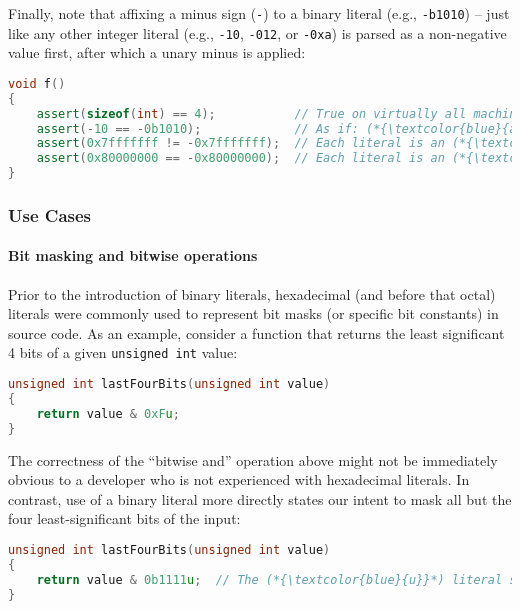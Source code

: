 \documentclass[twoside,10pt,letterpaper,usenames]{newstyle-PearsonGeneric-7-38}
\begin{document}
Finally, note that affixing a minus sign (\texttt{-}) to a binary
literal (e.g., \texttt{-b1010}) -- just like any other integer literal
(e.g., \texttt{-10}, \texttt{-012}, or \texttt{-0xa}) is parsed as a
non-negative value first, after which a unary minus is applied:

\begin{lstlisting}[language=C++]
void f()
{
    assert(sizeof(int) == 4);           // True on virtually all machines today.
    assert(-10 == -0b1010);             // As if: (*{\textcolor{blue}{assert(0 - 10 == 0 - 0b1010);}}*)
    assert(0x7fffffff != -0x7fffffff);  // Each literal is an (*{\textcolor{blue}{signed int}}*).
    assert(0x80000000 == -0x80000000);  // Each literal is an (*{\textcolor{blue}{unsigned int}}*).
}
\end{lstlisting}
    

\subsubsection[Use Cases]{Use Cases}\label{use-cases}

\paragraph[Bit masking and bitwise operations]{Bit masking and bitwise operations}\label{bit-masking-and-bitwise-operations}

Prior to the introduction of binary literals, hexadecimal (and before
that octal) literals were commonly used to represent bit masks (or
specific bit constants) in source code. As an example, consider a
function that returns the least significant 4 bits of a given
\texttt{unsigned int} value:

\begin{lstlisting}[language=C++]
unsigned int lastFourBits(unsigned int value)
{
    return value & 0xFu;
}
\end{lstlisting}
    

The correctness of the ``bitwise and'' operation above might not be
immediately obvious to a developer who is not experienced with
hexadecimal literals. In contrast, use of a binary literal more directly
states our intent to mask all but the four least-significant bits of the
input:

\begin{lstlisting}[language=C++]
unsigned int lastFourBits(unsigned int value)
{
    return value & 0b1111u;  // The (*{\textcolor{blue}{u}}*) literal suffix here is entirely optional.
}
\end{lstlisting}
    
\end{document}
